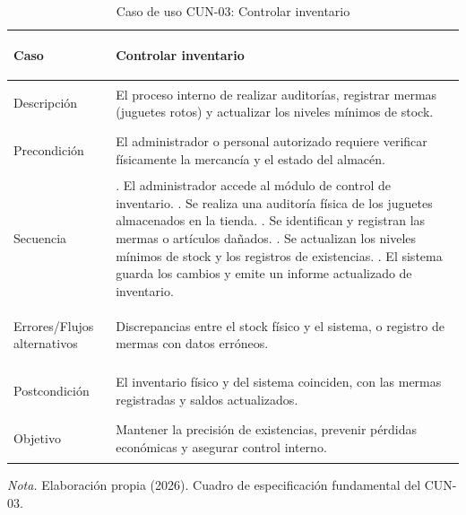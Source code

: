 \begin{table}[H]
  \centering
  \caption{Caso de uso CUN-03: Controlar inventario}
  \label{tab:cun_03}
  {\small
  \setlength{\tabcolsep}{4pt}
  \renewcommand{\arraystretch}{1.05}
  \begin{tabularx}{\textwidth}{|>{\bfseries\raggedright\arraybackslash}p{3.2cm}|>{\raggedright\arraybackslash}X|}
    \hline
    Caso & Controlar inventario \\
    \hline
    Descripción & El proceso interno de realizar auditorías, registrar mermas (juguetes rotos) y actualizar los niveles mínimos de stock. \\
    \hline
    Precondición & El administrador o personal autorizado requiere verificar físicamente la mercancía y el estado del almacén. \\
    \hline
    Secuencia &
    1. El administrador accede al módulo de control de inventario. \newline
    2. Se realiza una auditoría física de los juguetes almacenados en la tienda. \newline
    3. Se identifican y registran las mermas o artículos dañados. \newline
    4. Se actualizan los niveles mínimos de stock y los registros de existencias. \newline
    5. El sistema guarda los cambios y emite un informe actualizado de inventario. \\
    \hline
    Errores/Flujos alternativos & Discrepancias entre el stock físico y el sistema, o registro de mermas con datos erróneos. \\
    \hline
    Postcondición & El inventario físico y del sistema coinciden, con las mermas registradas y saldos actualizados. \\
    \hline
    Objetivo & Mantener la precisión de existencias, prevenir pérdidas económicas y asegurar control interno. \\
    \hline
  \end{tabularx}}
  \par\vspace{0.2ex}
  \raggedright\noindent\small \emph{Nota.} Elaboración propia (2026). Cuadro de especificación fundamental del CUN-03.
\end{table}

